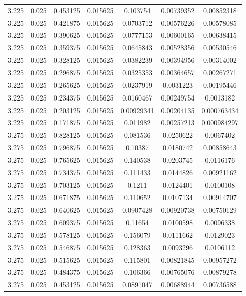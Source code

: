 \begin{flushleft}
\begin{longtable}{ccccccc}
3.225 & 0.025 & 0.453125 & 0.015625 & 0.103754 & 0.00739352 & 0.00852318  \\ 
3.225 & 0.025 & 0.421875 & 0.015625 & 0.0703712 & 0.00576226 & 0.00578085  \\ 
3.225 & 0.025 & 0.390625 & 0.015625 & 0.0777153 & 0.00600165 & 0.00638415  \\ 
3.225 & 0.025 & 0.359375 & 0.015625 & 0.0645843 & 0.00528356 & 0.00530546  \\ 
3.225 & 0.025 & 0.328125 & 0.015625 & 0.0382239 & 0.00394956 & 0.00314002  \\ 
3.225 & 0.025 & 0.296875 & 0.015625 & 0.0325353 & 0.00364657 & 0.00267271  \\ 
3.225 & 0.025 & 0.265625 & 0.015625 & 0.0237919 & 0.0031223 & 0.00195446  \\ 
3.225 & 0.025 & 0.234375 & 0.015625 & 0.0160467 & 0.00249754 & 0.0013182  \\ 
3.225 & 0.025 & 0.203125 & 0.015625 & 0.00929341 & 0.00204135 & 0.000763434  \\ 
3.225 & 0.025 & 0.171875 & 0.015625 & 0.011982 & 0.00257213 & 0.000984297  \\ 
3.275 & 0.025 & 0.828125 & 0.015625 & 0.081536 & 0.0250622 & 0.0067402  \\ 
3.275 & 0.025 & 0.796875 & 0.015625 & 0.10387 & 0.0180742 & 0.00858643  \\ 
3.275 & 0.025 & 0.765625 & 0.015625 & 0.140538 & 0.0203745 & 0.0116176  \\ 
3.275 & 0.025 & 0.734375 & 0.015625 & 0.111433 & 0.0144826 & 0.00921162  \\ 
3.275 & 0.025 & 0.703125 & 0.015625 & 0.1211 & 0.0124401 & 0.0100108  \\ 
3.275 & 0.025 & 0.671875 & 0.015625 & 0.110652 & 0.0107134 & 0.00914707  \\ 
3.275 & 0.025 & 0.640625 & 0.015625 & 0.0907428 & 0.00920738 & 0.00750129  \\ 
3.275 & 0.025 & 0.609375 & 0.015625 & 0.11654 & 0.0100598 & 0.0096338  \\ 
3.275 & 0.025 & 0.578125 & 0.015625 & 0.156079 & 0.0111662 & 0.0129023  \\ 
3.275 & 0.025 & 0.546875 & 0.015625 & 0.128363 & 0.0093296 & 0.0106112  \\ 
3.275 & 0.025 & 0.515625 & 0.015625 & 0.115801 & 0.00821845 & 0.00957272  \\ 
3.275 & 0.025 & 0.484375 & 0.015625 & 0.106366 & 0.00765076 & 0.00879278  \\ 
3.275 & 0.025 & 0.453125 & 0.015625 & 0.0891047 & 0.00688944 & 0.00736588  \\ 

\end{longtable}
\end{flushleft}
